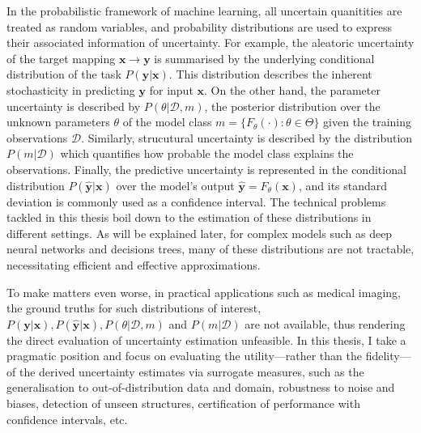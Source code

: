 In the probabilistic framework of machine learning, all uncertain quanitities are treated as random variables, and 
probability distributions are used to express their associated information of uncertainty. For example, the aleatoric uncertainty of the target mapping $\textbf{x} \rightarrow \mathbf{y}$ is summarised by the underlying conditional distribution of the task $P(\mathbf{y}|\mathbf{x})$. This distribution describes the inherent stochasticity in predicting $\mathbf{y}$ for input $\mathbf{x}$. On the other hand, the parameter uncertainty is described by $P(\theta|\mathcal{D}, m)$, the posterior distribution over the unknown parameters $\theta$ of the model class $m=\{F_{\theta}(\cdot): \theta \in \Theta\}$ given the training observations $\mathcal{D}$. Similarly, strucutural uncertainty is described by the distribution $P(m|\mathcal{D})$ which quantifies how probable the model class explains the observations. Finally, the predictive uncertainty is represented in the conditional distribution $P(\hat{\mathbf{y}}|\mathbf{x})$ over the model's output $\hat{\mathbf{y}}=F_{\theta}(\mathbf{x})$, and its standard deviation is commonly used as a confidence interval. The technical problems tackled in this thesis boil down to the estimation of these distributions in different settings. As will be explained later, for complex models such as deep neural networks and decisions trees, many of these distributions are not tractable, necessitating efficient and effective approximations. 

To make matters even worse, in practical applications such as medical imaging, the ground truths for such distributions of interest, $P(\mathbf{y}|\mathbf{x}), P(\hat{\mathbf{y}}|\mathbf{x}), P(\theta|\mathcal{D}, m)$ and $P(m|\mathcal{D})$ are not available, thus rendering the direct evaluation of uncertainty estimation unfeasible. In this thesis, I take a pragmatic position and focus on evaluating the utility---rather than the fidelity---of the derived uncertainty estimates via surrogate measures, such as the generalisation to out-of-distribution data and domain, robustness to noise and biases, detection of unseen structures, certification of performance with confidence intervals, etc. 


